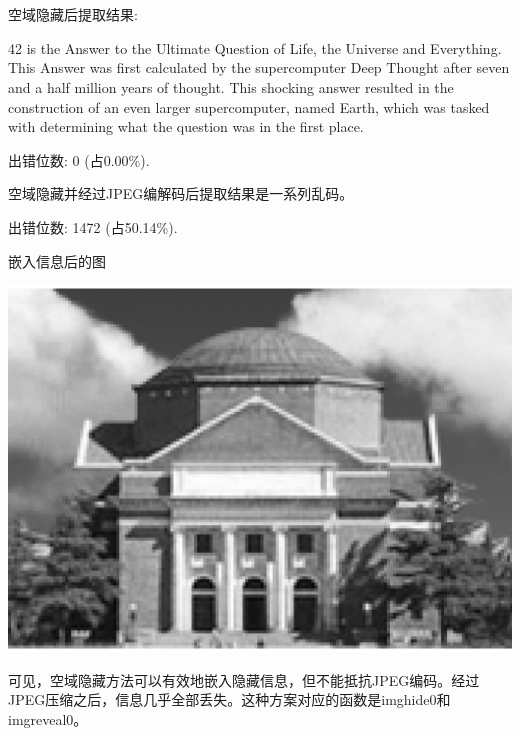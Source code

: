 \documentclass{article}
\begin{document}
\section{}
\subsection{}
\noindent{}
\par 空域隐藏后提取结果:
\par 	42 is the Answer to the Ultimate Question of Life, the Universe and Everything. This Answer was first calculated by the supercomputer Deep Thought after seven and a half million years of thought. This shocking answer resulted in the construction of an even larger supercomputer, named Earth, which was tasked with determining what the question was in the first place.
\par 出错位数: 0 (占0.00\%).
\par 空域隐藏并经过JPEG编解码后提取结果是一系列乱码。
\par 出错位数: 1472 (占50.14\%).
\par
\par 嵌入信息后的图
\begin{center}\includegraphics[width=\textwidth]{hidden0.eps}\end{center}
\par 可见，空域隐藏方法可以有效地嵌入隐藏信息，但不能抵抗JPEG编码。经过JPEG压缩之后，信息几乎全部丢失。这种方案对应的函数是imghide0和imgreveal0。
\end{document}
